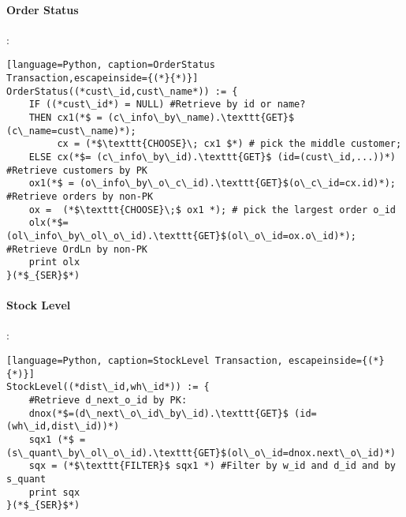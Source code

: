 \documentclass[12pt,letter]{article}
\begin{document}
\paragraph{Order Status}:
\begin{lstlisting}[language=Python, caption=OrderStatus
Transaction,escapeinside={(*}{*)}]
OrderStatus((*cust\_id,cust\_name*)) := {
	IF ((*cust\_id*) = NULL) #Retrieve by id or name?
	THEN cx1(*$ = (c\_info\_by\_name).\texttt{GET}$ (c\_name=cust\_name)*);
	     cx = (*$\texttt{CHOOSE}\; cx1 $*) # pick the middle customer;
	ELSE cx(*$= (c\_info\_by\_id).\texttt{GET}$ (id=(cust\_id,...))*) #Retrieve customers by PK
	ox1(*$ = (o\_info\_by\_o\_c\_id).\texttt{GET}$(o\_c\_id=cx.id)*); #Retrieve orders by non-PK
	ox =  (*$\texttt{CHOOSE}\;$ ox1 *);	# pick the largest order o_id
	olx(*$=(ol\_info\_by\_ol\_o\_id).\texttt{GET}$(ol\_o\_id=ox.o\_id)*); #Retrieve OrdLn by non-PK
	print olx  
}(*$_{SER}$*)
\end{lstlisting}



\vspace{10mm}
\paragraph{Stock Level}:
\begin{lstlisting}[language=Python, caption=StockLevel Transaction, escapeinside={(*}{*)}]
StockLevel((*dist\_id,wh\_id*)) := {
	#Retrieve d_next_o_id by PK:
	dnox(*$=(d\_next\_o\_id\_by\_id).\texttt{GET}$ (id=(wh\_id,dist\_id))*)
	sqx1 (*$ = (s\_quant\_by\_ol\_o\_id).\texttt{GET}$(ol\_o\_id=dnox.next\_o\_id)*)
	sqx = (*$\texttt{FILTER}$ sqx1 *) #Filter by w_id and d_id and by s_quant
	print sqx 
}(*$_{SER}$*)
\end{lstlisting}




\vspace{10 mm}
\end{document}
